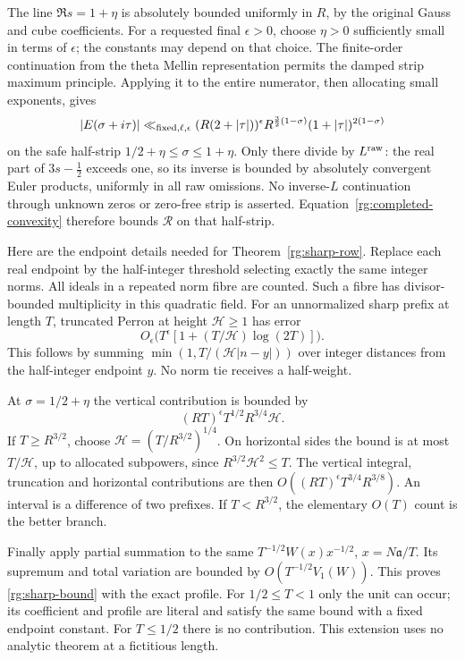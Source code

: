 The line \(\Re s=1+\eta\) is absolutely bounded uniformly in \(R\),
by the original Gauss and cube coefficients. For a requested final
\(\epsilon>0\), choose \(\eta>0\) sufficiently small in terms of
\(\epsilon\); the constants may depend on that choice.
The finite-order continuation from the theta Mellin representation
permits the damped strip maximum principle.
Applying it to the entire numerator, then allocating small exponents,
gives
\begin{equation}\label{rg:completed-convexity}
 |E(\sigma+i\tau)|
 \ll_{\rm fixed,\ell,\epsilon}
 (R(2+|\tau|))^\epsilon
 R^{\frac32(1-\sigma)}(1+|\tau|)^{2(1-\sigma)}
\end{equation}
on the safe half-strip \(1/2+\eta\le\sigma\le1+\eta\).
Only there divide by \(L^{\rm raw}\):
the real part of \(3s-\tfrac12\) exceeds one, so its inverse is
bounded by absolutely convergent Euler products, uniformly in all
raw omissions. No inverse-\(L\) continuation through unknown zeros
or zero-free strip is asserted.
Equation~\eqref{rg:completed-convexity} therefore bounds
\(\mathcal R\) on that half-strip.

Here are the endpoint details needed for
Theorem~\ref{rg:sharp-row}. Replace each real endpoint by the
half-integer threshold selecting exactly the same integer norms.
All ideals in a repeated norm fibre are counted. Such a fibre has
divisor-bounded multiplicity in this quadratic field.
For an unnormalized sharp prefix at length \(T\), truncated Perron
at height \(\mathcal H\ge1\) has error
\begin{equation}\label{rg:perron-error}
 O_\epsilon\bigl(T^\epsilon[1+(T/\mathcal H)\log(2T)]\bigr).
\end{equation}
This follows by summing
\(\min(1,T/(\mathcal H|n-y|))\) over integer distances from the
half-integer endpoint \(y\). No norm tie receives a half-weight.

At \(\sigma=1/2+\eta\) the vertical contribution is bounded by
\[
 (RT)^\epsilon T^{1/2}R^{3/4}\mathcal H .
\]
If \(T\ge R^{3/2}\), choose
\(\mathcal H=(T/R^{3/2})^{1/4}\).
On horizontal sides the bound is at most \(T/\mathcal H\),
up to allocated subpowers, since \(R^{3/2}\mathcal H^2\le T\).
The vertical integral, truncation and horizontal contributions
are then \(O((RT)^\epsilon T^{3/4}R^{3/8})\).
An interval is a difference of two prefixes. If \(T<R^{3/2}\),
the elementary \(O(T)\) count is the better branch.

Finally apply partial summation to the same
\(T^{-1/2}W(x)x^{-1/2}\), \(x=N\mathfrak a/T\).
Its supremum and total variation are bounded by
\(O(T^{-1/2}V_1(W))\). This proves
\eqref{rg:sharp-bound} with the exact profile.
For \(1/2\le T<1\) only the unit can occur; its coefficient and
profile are literal and satisfy the same bound with a fixed
endpoint constant. For \(T\le1/2\) there is no contribution.
This extension uses no analytic theorem at a fictitious length.

